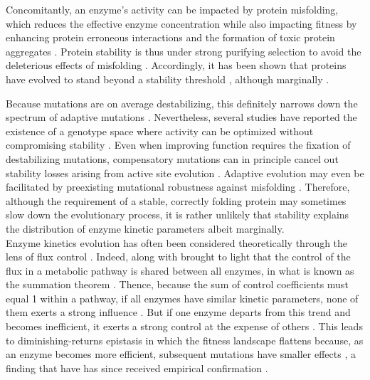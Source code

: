 \documentclass[11pt,onecolumn]{article}
\providecommand{\DIFadd}[1]{{\protect\color{blue} \sf #1}} %
\providecommand{\DIFdel}[1]{{\protect\color{red} \scriptsize #1}} %
\providecommand{\DIFaddbegin}{} %
\providecommand{\DIFaddend}{} %
\providecommand{\DIFdelbegin}{} %
\providecommand{\DIFdelend}{} %
\begin{document}
\DIFadd{Concomitantly, an enzyme's activity can be impacted by protein misfolding, which reduces the effective enzyme concentration \citep{Tokuriki09,Yue05,Drummond05,Echave17a} while also impacting fitness by enhancing protein erroneous interactions \citep{Yang12} and the formation of toxic protein aggregates \citep{Bucciantini02,Sabate10,Geiler-Samerotte11}. Protein stability is thus under strong purifying selection to avoid the deleterious effects of misfolding \citep{Drummond08}. Accordingly, it has been shown that proteins have evolved to stand beyond a stability threshold \citep{Bloom05}, although marginally \citep{Taverna02}. 
}

\DIFadd{Because mutations are on average destabilizing, this definitely narrows down the spectrum of adaptive mutations \citep{Shoichet95,DePristo05, Weinreich06,Tokuriki07,Tokuriki08, Lunzer10}. Nevertheless, several studies have reported the existence of a genotype space where activity can be optimized without compromising stability \citep{Schreiber94,Burg02,Bloom04,Knies17,Miller17}. Even when improving function requires the fixation of destabilizing mutations, compensatory mutations can in principle cancel out stability losses arising from active site evolution \citep{DePristo05,Tokuriki08,Tokuriki09,Storz18}. Adaptive evolution may even be facilitated by preexisting mutational robustness against misfolding \citep{Bloom06,Bloom07}. Therefore, although the requirement of a stable, correctly folding protein may sometimes slow down the evolutionary process, it is rather unlikely that stability explains the distribution of enzyme kinetic parameters albeit marginally.}\\


\DIFadd{Enzyme kinetics }\DIFaddend evolution has often been considered theoretically through the lens of flux control \DIFdelbegin \DIFdel{\citep{Burns85,Fell92,Kacser95}}\DIFdelend \DIFaddbegin \DIFadd{\citep{Burns85,Clark91,Fell92,Kacser95,Yi19}}\DIFaddend . Indeed, \DIFdelbegin \DIFdel{\citep{Kacser73} along with \citep{Heinrich74} brought to light that }\DIFdelend the control of the flux in a metabolic pathway is shared between all enzymes, in what is known as the summation theorem \DIFaddbegin \DIFadd{\citep{Kacser73,Heinrich74}}\DIFaddend . Thence, because the sum of control coefficients must equal 1 within a pathway, if all enzymes have similar kinetic parameters, none of them exerts a strong influence \DIFaddbegin \DIFadd{\citep{Dean95}}\DIFaddend . But if one enzyme departs from this trend and becomes inefficient, it exerts a strong control at the expense of others \DIFaddbegin \DIFadd{\citep{Dykhuizen90}}\DIFaddend . This leads to diminishing-returns epistasis \DIFaddbegin \DIFadd{in which the fitness landscape flattens }\DIFaddend because, as an enzyme becomes more efficient, subsequent mutations have smaller effects \citep{Kacser73,Dykhuizen87,Tokuriki12}, a finding that \DIFdelbegin \DIFdel{have }\DIFdelend \DIFaddbegin \DIFadd{has }\DIFaddend since received empirical confirmation \DIFdelbegin \DIFdel{\citep{Fell92,Lunzer05}}\DIFdelend \DIFaddbegin \DIFadd{\citep{Fell92,Dean95,Lunzer05,Yi19,Chou14}}\DIFaddend .
\end{document}
